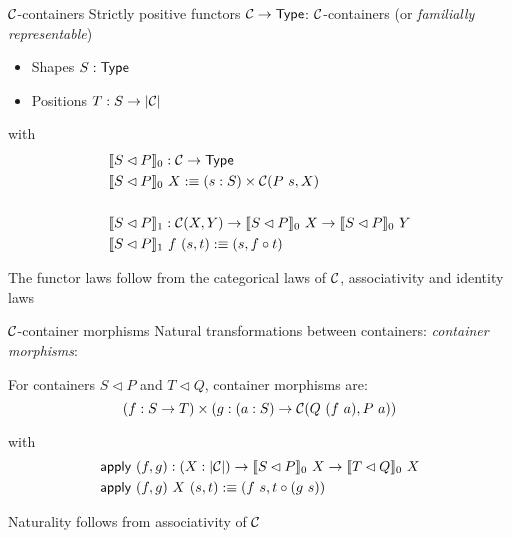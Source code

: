 \documentclass{beamer}
\begin{document}
\begin{frame}{$\mathcal{C}$-containers}
  Strictly positive functors $\mathcal{C} \to \mathsf{Type}$: $\mathcal{C}$-containers (or \emph{familially representable})

  \begin{itemize}
  \item Shapes $S : \mathsf{Type}$
  \item Positions $T : S \to | \mathcal{C} | $
  \end{itemize}
  with
  \begin{align*}
  &\llbracket S \lhd P \rrbracket_0 : \C \to \Type \\
  &\llbracket S \lhd P \rrbracket_0\ X \ddefeq (s : S) \times \C(P\ s, X) \\
    \\
  &\llbracket S \lhd P \rrbracket_1 : \C(X , Y) \to \llbracket S \lhd P \rrbracket_0\ X \to \llbracket S \lhd P \rrbracket_0\ Y \\
  &\llbracket S \lhd P \rrbracket_1\ f\ (s , t) \ddefeq (s , f \circ t)
  \end{align*}

  The functor laws follow from the categorical laws of $\mathcal{C}$, \ie
  associativity and identity laws
\end{frame}

\begin{frame}{$\mathcal{C}$-container morphisms}
  Natural transformations between containers: \emph{container
      morphisms}:

  For containers $S \lhd P$ and $T \lhd Q$, container morphisms are:
  $$
  (f : S \to T) \times  (g : (a : S) \to \mathcal{C} (Q\ (f\ a), P\ a))
  $$

  with 
  \begin{align*}
    &\mathsf{apply}\ (f , g) : (X : | \mathcal{C} |) \to 
      \llbracket S \lhd P \rrbracket_0\ X \to 
      \llbracket T \lhd Q \rrbracket_0\ X \\
    &\mathsf{apply}\ (f , g)\ X\ (s , t) :\equiv (f\ s , t \circ (g\ s))
  \end{align*}

  Naturality follows from associativity of $\mathcal{C}$
\end{frame}
\end{document}
